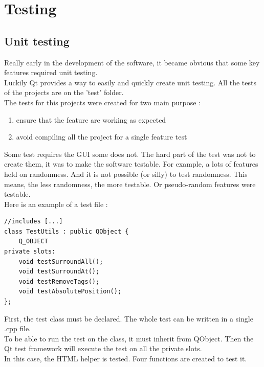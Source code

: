 \part{Testing}

\chapter{Unit testing}
Really early in the development of the software, it became obvious that some key features required unit testing.\\
Luckily Qt provides a way to easily and quickly create unit testing. All the tests of the projects are on the 'test' folder.\\
The tests for this projects were created for two main purpose :
\begin{enumerate}
	\item ensure that the feature are working as expected
	\item avoid compiling all the project for a single feature test
\end{enumerate}
Some test requires the GUI some does not. The hard part of the test was not to create them, it was to make the software testable. For example, a lots of features held on randomness. And it is not possible (or silly) to test randomness. This means, the less randomness, the more testable. Or pseudo-random features were testable.\\
Here is an example of a test file :

\begin{lstlisting}
//includes [...]
class TestUtils : public QObject {
    Q_OBJECT
private slots:
    void testSurroundAll();
    void testSurroundAt();
    void testRemoveTags();
    void testAbsolutePosition();
};
\end{lstlisting}
First, the test class must be declared. The whole test can be written in a single .cpp file.\\
To be able to run the test on the class, it must inherit from QObject. Then the Qt test framework will execute the test on all the
private slots.\\
In this case, the HTML helper is tested. Four functions are created to test it.

